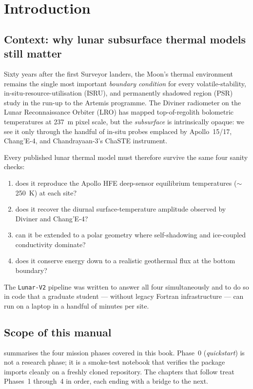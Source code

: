 \chapter{Introduction}
\label{chap:introduction}

\section{Context: why lunar subsurface thermal models still matter}

Sixty years after the first Surveyor landers, the Moon's thermal
environment remains the single most important \emph{boundary condition}
for every volatile-stability, in-situ-resource-utilisation (ISRU), and
permanently shadowed region (PSR) study in the run-up to the Artemis
programme.  The Diviner radiometer on the Lunar Reconnaissance Orbiter
(LRO) has mapped top-of-regolith bolometric temperatures at
\SI{237}{\meter} pixel scale, but the \emph{subsurface} is
intrinsically opaque: we see it only through the handful of in-situ
probes emplaced by Apollo~15/17, Chang'E-4, and Chandrayaan-3's ChaSTE
instrument.

Every published lunar thermal model must therefore survive the same
four sanity checks:
\begin{enumerate}
  \item does it reproduce the Apollo HFE deep-sensor equilibrium
        temperatures ($\sim$\SI{250}{\kelvin}) at each site?
  \item does it recover the diurnal surface-temperature amplitude
        observed by Diviner and Chang'E-4?
  \item can it be extended to a polar geometry where self-shadowing and
        ice-coupled conductivity dominate?
  \item does it conserve energy down to a realistic geothermal flux at
        the bottom boundary?
\end{enumerate}
\noindent The \texttt{Lunar-V2} pipeline was written to answer all four
simultaneously and to do so in code that a graduate student --- without
legacy Fortran infrastructure --- can run on a laptop in a handful of
minutes per site.

\section{Scope of this manual}

 summarises the four mission phases covered in
this book.  Phase~0 (\emph{quickstart}) is not a research phase; it is
a smoke-test notebook that verifies the  package imports
cleanly on a freshly cloned repository.  The chapters that follow treat
Phases~1 through~4 in order, each ending with a bridge to the next.


